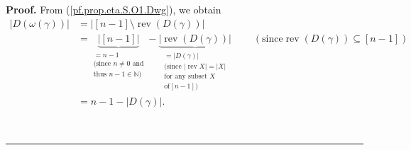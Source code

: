 \documentclass[numbers=enddot,12pt,final,onecolumn,notitlepage]{scrartcl}%
\theoremstyle{definition}
\newenvironment{proof}[1][Proof]{\noindent\textbf{#1.} }{\ \rule{0.5em}{0.5em}}
\newenvironment{noncompile}{}{}
\begin{document}
\begin{proof}
\begin{noncompile}
From (\ref{pf.prop.eta.S.O1.Dwg}), we obtain%
\begin{align}
\left\vert D\left(  \omega\left(  \gamma\right)  \right)  \right\vert  &
=\left\vert \left[  n-1\right]  \setminus\operatorname*{rev}\left(  D\left(
\gamma\right)  \right)  \right\vert \nonumber\\
&  =\underbrace{\left\vert \left[  n-1\right]  \right\vert }%
_{\substack{=n-1\\\text{(since }n\neq0\text{ and}\\\text{thus }n-1\in
\mathbb{N}\text{)}}}-\underbrace{\left\vert \operatorname*{rev}\left(
D\left(  \gamma\right)  \right)  \right\vert }_{\substack{=\left\vert D\left(
\gamma\right)  \right\vert \\\text{(since }\left\vert \operatorname*{rev}%
X\right\vert =\left\vert X\right\vert \\\text{for any subset }X\\\text{of
}\left[  n-1\right]  \text{)}}}\ \ \ \ \ \ \ \ \ \ \left(  \text{since
}\operatorname*{rev}\left(  D\left(  \gamma\right)  \right)  \subseteq\left[
n-1\right]  \right) \nonumber\\
&  =n-1-\left\vert D\left(  \gamma\right)  \right\vert .
\label{pf.prop.eta.S.O1.Dwgsize}%
\end{align}



\end{noncompile}
\end{proof}
\end{document}
